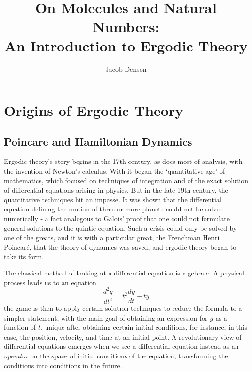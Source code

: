 


\title{On Molecules and Natural Numbers:\\
An Introduction to Ergodic Theory}
\author{Jacob Denson}




\maketitle



\chapter{Origins of Ergodic Theory}

\section{Poincare and Hamiltonian Dynamics}

Ergodic theory's story begins in the 17th century, as does most of analysis, with the invention of Newton's calculus. With it began the `quantitative age' of mathematics, which focused on techniques of integration and of the exact solution of differential equations arising in physics. But in the late 19th century, the quantitative techniques hit an impasse. It was shown that the differential equation defining the motion of three or more planets could not be solved numerically - a fact analogous to Galois' proof that one could not formulate general solutions to the quintic equation. Such a crisis could only be solved by one of the greats, and it is with a particular great, the Frenchman Henri Poincar\'{e}, that the theory of dynamics was saved, and ergodic theory began to take its form.

The classical method of looking at a differential equation is algebraic. A physical process leads us to an equation
%
\[ \frac{d^2 y}{dt^2} = t^2 \frac{dy}{dt} - ty \]
%
the game is then to apply certain solution techniques to reduce the formula to a simpler statement, with the main goal of obtaining an expression for $y$ as a function of $t$, unique after obtaining certain initial conditions, for instance, in this case, the position, velocity, and time at an initial point. A revolutionary view of differential equations emerges when we see a differential equation instead as an {\it operator} on the space of initial conditions of the equation, transforming the conditions into conditions in the future.


